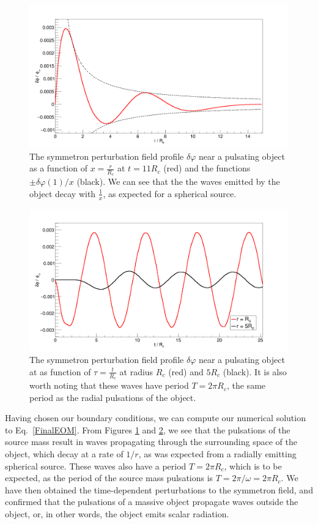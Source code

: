 \documentclass[nofootinbib,twocolumn]{revtex4}
\begin{document}
\begin{figure}[ht]
    \centering
    \includegraphics[width=1\columnwidth]{Images/P_t11.png}
    \caption{The symmetron perturbation field profile $\delta\varphi$ near a pulsating object as a function of $x = \frac{r}{R_c}$ at $t = 11R_c$ (red) and the functions $\pm \delta\varphi(1)/x$ (black). We can see that the the waves emitted by the object decay with $\frac{1}{x}$, as expected for a spherical source.   }
    \label{ProfileT6}
\end{figure}
\begin{figure}[ht]
    \centering
    \includegraphics[width=1\columnwidth]{Images/P_r.png}
    \caption{The symmetron perturbation field profile $\delta\varphi$ near a pulsating object at as function of $\tau = \frac{t}{R_c}$ at radius $R_c$ (red) and $5R_c$ (black). It is also worth noting that these waves have period $T = 2\pi R_c$, the same period as the radial pulsations of the object.  }
    \label{ProfileR}
\end{figure}
Having chosen our boundary conditions, we can compute our numerical solution to Eq.~\eqref{FinalEOM}. From Figures \ref{ProfileT6} and \ref{ProfileR}, we see that the pulsations of the source mass result in waves propagating through the surrounding space of the object, which decay at a rate of $1/r$, as was expected from a radially emitting spherical source. These waves also have a period $T = 2\pi R_c$, which is to be expected, as the period of the source mass pulsations is $T = 2\pi / \omega = 2\pi R_c$. We have then obtained the time-dependent perturbations to the symmetron field, and confirmed that the pulsations of a massive object propagate waves outside the object, or, in other words, the object emits scalar radiation. 
\end{document}
